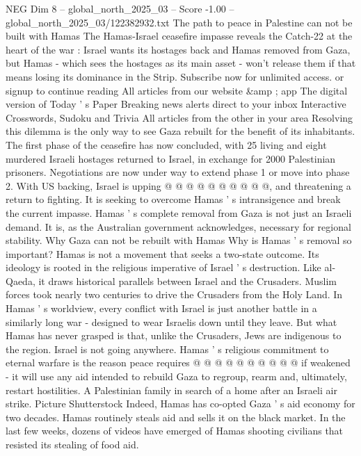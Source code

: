 \begin{textsample}{NEG Dim 8 – global\_north\_2025\_03 – Score -1.00 – global\_north\_2025\_03/122382932.txt}  \label{ex:f8_neg_363}
The path to peace in Palestine can not be built with Hamas The Hamas-Israel ceasefire impasse reveals the Catch-22 at the heart of the war : Israel wants its hostages back and Hamas removed from Gaza, but Hamas - which sees the hostages as its main asset - won't release them if that means losing its dominance in the Strip.
Subscribe now for unlimited access. or signup to continue reading All articles from our website \&amp ; app The digital version of Today ' s Paper Breaking news alerts direct to your inbox Interactive Crosswords, Sudoku and Trivia All articles from the other in your area Resolving this dilemma is the only way to see Gaza rebuilt for the benefit of its inhabitants.
The first phase of the ceasefire has now concluded, with 25 living and eight murdered Israeli hostages returned to Israel, in exchange for 2000 Palestinian prisoners.
Negotiations are now under way to extend phase 1 or move into phase 2.
With US backing, Israel is upping @ @ @ @ @ @ @ @ @ @, and threatening a return to fighting.
It is seeking to overcome Hamas ' s intransigence and break the current impasse.
Hamas ' s complete removal from Gaza is not just an Israeli demand.
It is, as the Australian government acknowledges, necessary for regional stability.
Why Gaza can not be rebuilt with Hamas Why is Hamas ' s removal so important?
Hamas is not a movement that seeks a two-state outcome.
Its ideology is rooted in the religious imperative of Israel ' s destruction.
Like al-Qaeda, it draws historical parallels between Israel and the Crusaders.
Muslim forces took nearly two centuries to drive the Crusaders from the Holy Land.
In Hamas ' s worldview, every conflict with Israel is just another battle in a similarly long war - designed to wear Israelis down until they leave.
But what Hamas has never grasped is that, unlike the Crusaders, Jews are indigenous to the region.
Israel is not going anywhere.
Hamas ' s religious commitment to eternal warfare is the reason peace requires @ @ @ @ @ @ @ @ @ @ if weakened - it will use any aid intended to rebuild Gaza to regroup, rearm and, ultimately, restart hostilities.
A Palestinian family in search of a home after an Israeli air strike.
Picture Shutterstock Indeed, Hamas has co-opted Gaza ' s aid economy for two decades.
Hamas routinely steals aid and sells it on the black market.
In the last few weeks, dozens of videos have emerged of Hamas shooting civilians that resisted its stealing of food aid.

\end{textsample}
